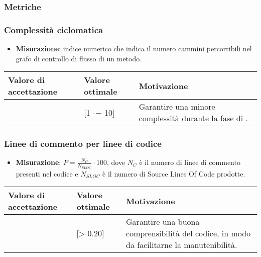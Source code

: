 \subsubsection{Metriche}

\subsubsection{Complessità ciclomatica}

\begin{itemize}
\item \textbf{Misurazione}: indice numerico che indica il numero cammini percorribili nel grafo di controllo di flusso di un metodo.
\end{itemize}

\begin{center}
		\begin{tabular}{|P{2.5cm}|P{2.5cm}|P{6cm}|}
		\hline
			\textbf{Valore di accettazione}	& \textbf{Valore ottimale} & \textbf{Motivazione} \\
			\hline
			[1 -− 15] & [1 -− 10] &	Garantire una minore complessità durante la fase di \COD. \\
			\hline
			\end{tabular}
\end{center}


\subsubsection{Linee di commento per linee di codice}

\begin{itemize}
\item \textbf{Misurazione}: $P=\frac{N_{C}}{N_{SLOC}} \cdot 100$, dove $N_{C}$ è il numero di linee di commento presenti nel codice e $N_{SLOC}$ è il numero di Source Lines Of Code prodotte.
\end{itemize}

\begin{center}
		\begin{tabular}{|P{2.5cm}|P{2.5cm}|P{6cm}|}
		\hline
			\textbf{Valore di accettazione}	& \textbf{Valore ottimale} & \textbf{Motivazione} \\
			\hline
			[> 0.15] & [> 0.20] &	Garantire una buona comprensibilità del codice, in modo da facilitarne la manutenibilità. \\
			\hline
			\end{tabular}
\end{center}

